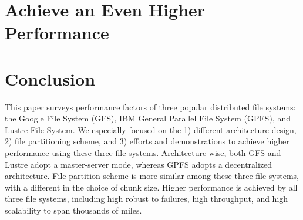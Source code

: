 \documentclass[12pt,twocolumn]{IEEEtran11}
\begin{document}
\section{Achieve an Even Higher Performance}
\label{sec:performance}



\section{Conclusion}
This paper surveys performance factors of three popular distributed 
file systems: the Google File System (GFS), IBM General Parallel 
File System (GPFS), and Lustre File System.
%
We especially focused on the 1) different architecture design,
2) file partitioning scheme, and 3) efforts and demonstrations to achieve
higher performance using these three file systems.
%
Architecture wise, both GFS and Lustre adopt a master-server mode, whereas
GPFS adopts a decentralized architecture.
%
File partition scheme is more similar among these three file systems, 
with a different in the choice of chunk size.
%
Higher performance is achieved by all three file systems, including 
high robust to failures, high throughput, and high scalability to span
thousands of miles.

%


\end{document}
